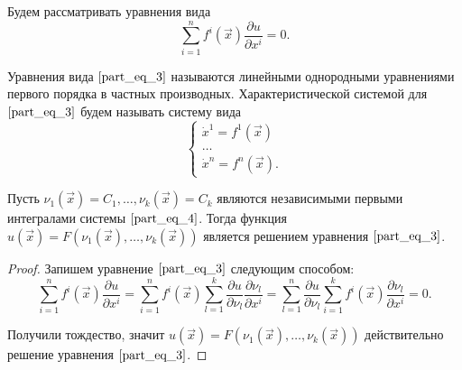 Будем рассматривать уравнения вида
\begin{equation}
    \sum \limits_{i = 1}^{n} f^{i} \left( \vec{x} \right) \frac{\partial u}{\partial x^{i}} = 0.
    \label{part_eq_3}
\end{equation}

\begin{definition}
    Уравнения вида $\eqref{part_eq_3}$ называются линейными однородными уравнениями первого порядка в частных производных. Характеристической системой для $\eqref{part_eq_3}$ будем называть систему вида
    \begin{equation}
        \begin{cases}
            \dot{x}^1 = f^1 \left( \vec{x} \right) \\
            \dots                                  \\
            \dot{x}^n = f^n \left( \vec{x} \right).
        \end{cases}
        \label{part_eq_4}
    \end{equation}
\end{definition}

\begin{theorem}
    Пусть $\nu_1 \left( \vec{x} \right) = C_1, \dots, \nu_k \left( \vec{x} \right) = C_k$ являются независимыми первыми интегралами системы $\eqref{part_eq_4}$. Тогда функция $u \left( \vec{x} \right) = F \left( \nu_1 \left( \vec{x} \right), \dots, \nu_k \left( \vec{x} \right) \right) $ является решением уравнения $\eqref{part_eq_3}$.
\end{theorem}
\begin{proof}
    Запишем уравнение $\eqref{part_eq_3}$ следующим способом:
    \begin{equation*}
        \sum \limits_{i = 1}^{n} f^{i} \left( \vec{x} \right)  \frac{\partial u}{\partial x^{i}} = \sum \limits_{i = 1}^{n} f^{i} \left( \vec{x} \right)  \sum \limits_{l = 1}^{k} \frac{\partial u}{\partial \nu_l} \frac{\partial \nu_l}{\partial x^{i}} = \sum \limits_{l = 1}^{n} \frac{\partial u}{\partial \nu_l} \sum \limits_{i = 1}^{k} f^{i} \left( \vec{x} \right)  \frac{\partial \nu_l}{\partial x^{i}} = 0.
    \end{equation*}
    
    Получили тождество, значит $u \left( \vec{x} \right) = F \left( \nu_1 \left( \vec{x} \right), \dots, \nu_k \left( \vec{x} \right) \right)$ действительно решение уравнения $\eqref{part_eq_3}$.
\end{proof}

